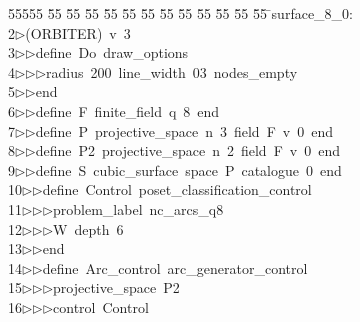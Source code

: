 %
%
\begin{tabbing}
55555 \= 55 \= 55 \= 55 \= 55 \= 55 \= 55 \= 55 \= 55 \= 55 \= 55 \= 55 \= 55 \= \>surface\_8\_0:\\[0pt]
2\>$\triangleright$\>(ORBITER)\ v\ 3\ \\[0pt]
3\>$\triangleright$\>$\triangleright$\>define\ Do\ draw\_options\ \\[0pt]
4\>$\triangleright$\>$\triangleright$\>$\triangleright$\>radius\ 200\ line\_width\ 03\ nodes\_empty\ \\[0pt]
5\>$\triangleright$\>$\triangleright$\>end\ \\[0pt]
6\>$\triangleright$\>$\triangleright$\>define\ F\ finite\_field\ q\ 8\ end\ \\[0pt]
7\>$\triangleright$\>$\triangleright$\>define\ P\ projective\_space\ n\ 3\ field\ F\ v\ 0\ end\ \\[0pt]
8\>$\triangleright$\>$\triangleright$\>define\ P2\ projective\_space\ n\ 2\ field\ F\ v\ 0\ end\ \\[0pt]
9\>$\triangleright$\>$\triangleright$\>define\ S\ cubic\_surface\ space\ P\ catalogue\ 0\ end\ \\[0pt]
10\>$\triangleright$\>$\triangleright$\>define\ Control\ poset\_classification\_control\ \\[0pt]
11\>$\triangleright$\>$\triangleright$\>$\triangleright$\>problem\_label\ nc\_arcs\_q8\ \\[0pt]
12\>$\triangleright$\>$\triangleright$\>$\triangleright$\>W\ depth\ 6\ \\[0pt]
13\>$\triangleright$\>$\triangleright$\>end\ \\[0pt]
14\>$\triangleright$\>$\triangleright$\>define\ Arc\_control\ arc\_generator\_control\ \\[0pt]
15\>$\triangleright$\>$\triangleright$\>$\triangleright$\>projective\_space\ P2\ \\[0pt]
16\>$\triangleright$\>$\triangleright$\>$\triangleright$\>control\ Control\ \\[0pt]

\end{tabbing}

